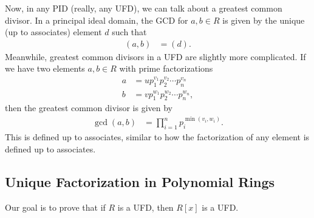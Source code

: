 \documentclass[10pt]{mypackage}
\begin{document}
Now, in any PID (really, any UFD), we can talk about a greatest common divisor. In a principal ideal domain, the GCD for $a,b\in R$ is given by the unique (up to associates) element $d$ such that
\begin{align*}
  \left( a,b \right) &= \left( d \right).
\end{align*}
Meanwhile, greatest common divisors in a UFD are slightly more complicated. If we have two elements $a,b\in R$ with prime factorizations
\begin{align*}
  a &= up_1^{v_1}p_2^{v_2}\cdots p_n^{v_n}\\
  b &= vp_1^{w_1}p_2^{w_2}\cdots p_n^{w_n},
\end{align*}
then the greatest common divisor is given by
\begin{align*}
  \gcd\left( a,b \right) &= \prod_{i=1}^{n} p_i^{\operatorname{min}\left( v_i,w_i \right)}.
\end{align*}
This is defined up to associates, similar to how the factorization of any element is defined up to associates.
\subsection{Unique Factorization in Polynomial Rings}%
Our goal is to prove that if $R$ is a UFD, then $R[x]$ is a UFD.%
\end{document}
